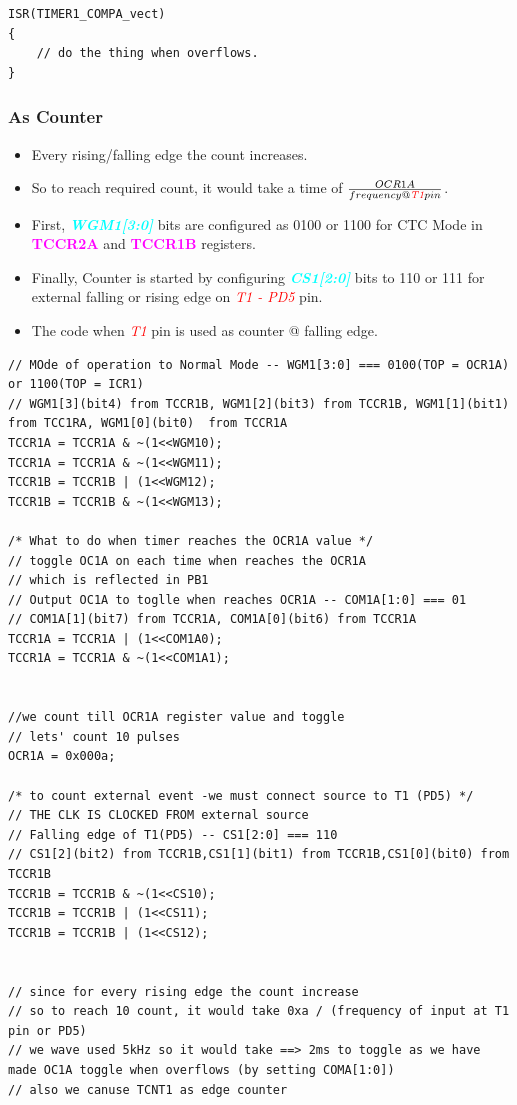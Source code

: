 \documentclass{article}
\newcommand{\bitFormat}[1]{\emph{\textbf{\textcolor{cyan}{#1}}}}
\newcommand{\regFormat}[1]{\textbf{\textcolor{magenta}{#1}}}
\newcommand{\pinFormat}[1]{\emph{\textcolor{red}{#1}}}
\begin{document}
\begin{verbatim}
ISR(TIMER1_COMPA_vect)
{
    // do the thing when overflows.
}
\end{verbatim}


\subsubsection{As Counter}
\begin{itemize}
    \item Every rising/falling edge the count increases.
    \item So to reach required count, it would take a time of $\frac{OCR1A}{frequency @ \pinFormat{T1} pin}$.
    \item First, \bitFormat{WGM1[3:0]} bits are configured as 0100 or 1100 for CTC Mode in \regFormat{TCCR2A} and \regFormat{TCCR1B} registers.
    \item Finally, Counter is started by configuring \bitFormat{CS1[2:0]} bits to 110 or 111 for external falling or rising edge on \pinFormat{T1 - PD5} pin.
    \item The code when \pinFormat{T1} pin is used as counter @ falling edge.
\end{itemize}

\begin{verbatim}
// MOde of operation to Normal Mode -- WGM1[3:0] === 0100(TOP = OCR1A) or 1100(TOP = ICR1)
// WGM1[3](bit4) from TCCR1B, WGM1[2](bit3) from TCCR1B, WGM1[1](bit1)  from TCC1RA, WGM1[0](bit0)  from TCCR1A	
TCCR1A = TCCR1A & ~(1<<WGM10);
TCCR1A = TCCR1A & ~(1<<WGM11);
TCCR1B = TCCR1B | (1<<WGM12);
TCCR1B = TCCR1B & ~(1<<WGM13);

/* What to do when timer reaches the OCR1A value */
// toggle OC1A on each time when reaches the OCR1A
// which is reflected in PB1
// Output OC1A to toglle when reaches OCR1A -- COM1A[1:0] === 01
// COM1A[1](bit7) from TCCR1A, COM1A[0](bit6) from TCCR1A
TCCR1A = TCCR1A | (1<<COM1A0);
TCCR1A = TCCR1A & ~(1<<COM1A1);


//we count till OCR1A register value and toggle
// lets' count 10 pulses
OCR1A = 0x000a;

/* to count external event -we must connect source to T1 (PD5) */
// THE CLK IS CLOCKED FROM external source
// Falling edge of T1(PD5) -- CS1[2:0] === 110
// CS1[2](bit2) from TCCR1B,CS1[1](bit1) from TCCR1B,CS1[0](bit0) from TCCR1B
TCCR1B = TCCR1B & ~(1<<CS10);
TCCR1B = TCCR1B | (1<<CS11);
TCCR1B = TCCR1B | (1<<CS12);


// since for every rising edge the count increase
// so to reach 10 count, it would take 0xa / (frequency of input at T1 pin or PD5)
// we wave used 5kHz so it would take ==> 2ms to toggle as we have made OC1A toggle when overflows (by setting COMA[1:0])
// also we canuse TCNT1 as edge counter
\end{verbatim}
\end{document}
